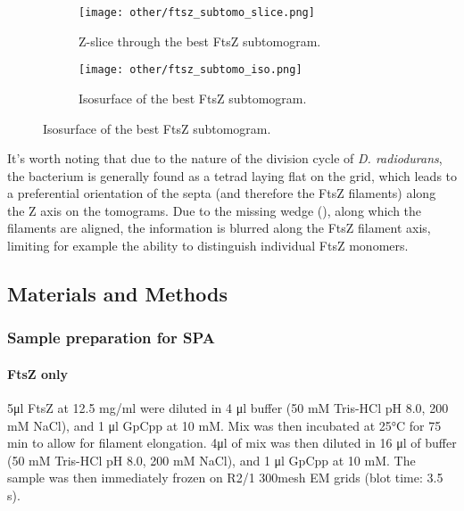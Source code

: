 \begin{figure}[ht]
    \centering
    \begin{subfigure}[B]{.49\textwidth}
        \centering
        \texttt{[image: other/ftsz\_subtomo\_slice.png]}
        \caption{Z-slice through the best FtsZ subtomogram.}
        \label{fig:ftsz_subtomo_slice}
    \end{subfigure}%
    \hfill
    \begin{subfigure}[B]{.49\textwidth}
        \centering
        \texttt{[image: other/ftsz\_subtomo\_iso.png]}
        \caption{Isosurface of the best FtsZ subtomogram.}
        \label{fig:ftsz_subtomo_iso}
    \end{subfigure}%
    \label{fig:ftsz_subtomo}
\end{figure}

It's worth noting that due to the nature of the division cycle of \textit{D. radiodurans}, the bacterium is generally found as a tetrad laying flat on the grid, which leads to a preferential orientation of the septa (and therefore the FtsZ filaments) along the Z axis on the tomograms.
Due to the missing wedge (), along which the filaments are aligned, the information is blurred along the FtsZ filament axis, limiting for example the ability to distinguish individual FtsZ monomers.

\subsection{Materials and Methods}\label{ftsz_methods}

\subsubsection{Sample preparation for SPA}

\paragraph{FtsZ only}
5μl FtsZ at 12.5 mg/ml were diluted in 4 μl buffer (50 mM Tris-HCl pH 8.0, 200 mM NaCl), and 1 μl GpCpp at 10 mM.
Mix was then incubated at 25°C for 75 min to allow for filament elongation.
4μl of mix was then diluted in 16 μl of buffer (50 mM Tris-HCl pH 8.0, 200 mM NaCl), and 1 μl GpCpp at 10 mM.
The sample was then immediately frozen on R2/1 300mesh EM grids (blot time: 3.5 s).

